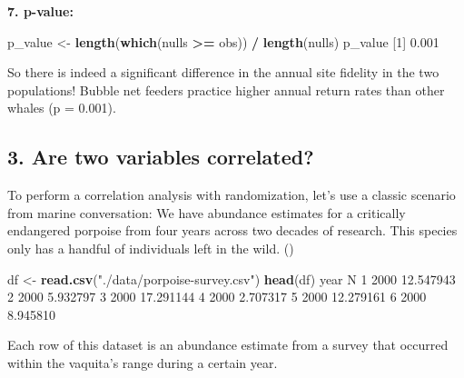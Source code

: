 \documentclass[]{book}
\newenvironment{Shaded}{\begin{snugshade}}{\end{snugshade}}
\newcommand{\DataTypeTok}[1]{\textcolor[rgb]{0.13,0.29,0.53}{#1}}
\newcommand{\DecValTok}[1]{\textcolor[rgb]{0.00,0.00,0.81}{#1}}
\newcommand{\FloatTok}[1]{\textcolor[rgb]{0.00,0.00,0.81}{#1}}
\newcommand{\KeywordTok}[1]{\textcolor[rgb]{0.13,0.29,0.53}{\textbf{#1}}}
\newcommand{\NormalTok}[1]{#1}
\newcommand{\OperatorTok}[1]{\textcolor[rgb]{0.81,0.36,0.00}{\textbf{#1}}}
\newcommand{\StringTok}[1]{\textcolor[rgb]{0.31,0.60,0.02}{#1}}
\begin{document}
\textbf{7. p-value:}

\begin{Shaded}
\begin{Highlighting}[]
\NormalTok{p_value <-}\StringTok{ }\KeywordTok{length}\NormalTok{(}\KeywordTok{which}\NormalTok{(nulls }\OperatorTok{>=}\StringTok{ }\NormalTok{obs)) }\OperatorTok{/}\StringTok{ }\KeywordTok{length}\NormalTok{(nulls)}
\NormalTok{p_value}
\NormalTok{[}\DecValTok{1}\NormalTok{] }\FloatTok{0.001}
\end{Highlighting}
\end{Shaded}

So there is indeed a significant difference in the annual site fidelity in the two populations! Bubble net feeders practice higher annual return rates than other whales (p = 0.001).

\hypertarget{are-two-variables-correlated}{%
\subsection*{3. Are two variables correlated?}\label{are-two-variables-correlated}}

To perform a correlation analysis with randomization, let's use a classic scenario from marine conversation: We have abundance estimates for a critically endangered porpoise from four years across two decades of research. This species only has a handful of individuals left in the wild. ()

\begin{Shaded}
\begin{Highlighting}[]
\NormalTok{df <-}\StringTok{ }\KeywordTok{read.csv}\NormalTok{(}\StringTok{"./data/porpoise-survey.csv"}\NormalTok{)}
\KeywordTok{head}\NormalTok{(df)}
\NormalTok{  year         N}
\DecValTok{1} \DecValTok{2000} \FloatTok{12.547943}
\DecValTok{2} \DecValTok{2000}  \FloatTok{5.932797}
\DecValTok{3} \DecValTok{2000} \FloatTok{17.291144}
\DecValTok{4} \DecValTok{2000}  \FloatTok{2.707317}
\DecValTok{5} \DecValTok{2000} \FloatTok{12.279161}
\DecValTok{6} \DecValTok{2000}  \FloatTok{8.945810}
\end{Highlighting}
\end{Shaded}

Each row of this dataset is an abundance estimate from a survey that occurred within the vaquita's range during a certain year.

\begin{Shaded}
\end{Shaded}
\end{document}
